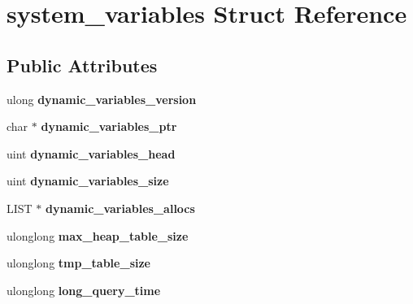 \hypertarget{structsystem__variables}{}\section{system\+\_\+variables Struct Reference}
\label{structsystem__variables}
\subsection*{Public Attributes}
\begin{DoxyCompactItemize}
\item 
\mbox{\label{structsystem__variables_a17c0e1eec6bb868c41ac0775a210aab7}} 
ulong {\bfseries dynamic\+\_\+variables\+\_\+version}
\item 
\mbox{\label{structsystem__variables_a066bb629dd4f3474ae1eb7720c7918a9}} 
char $\ast$ {\bfseries dynamic\+\_\+variables\+\_\+ptr}
\item 
\mbox{\label{structsystem__variables_a2a145437e0839ca577b8403c96d674c5}} 
uint {\bfseries dynamic\+\_\+variables\+\_\+head}
\item 
\mbox{\label{structsystem__variables_a162543cb8841b95bf0d780ebaf03c407}} 
uint {\bfseries dynamic\+\_\+variables\+\_\+size}
\item 
\mbox{\label{structsystem__variables_a151cfc2712373038ccfc7e57190c0f98}} 
L\+I\+ST $\ast$ {\bfseries dynamic\+\_\+variables\+\_\+allocs}
\item 
\mbox{\label{structsystem__variables_acc0cddb943107a9049d2152be45c5e58}} 
ulonglong {\bfseries max\+\_\+heap\+\_\+table\+\_\+size}
\item 
\mbox{\label{structsystem__variables_ad493755652bcfeca2ac320e74e19cc47}} 
ulonglong {\bfseries tmp\+\_\+table\+\_\+size}
\item 
\mbox{\label{structsystem__variables_a368270745ccef48c466b49d721ef047f}} 
ulonglong {\bfseries long\+\_\+query\+\_\+time}
\item 

\end{DoxyCompactItemize}
